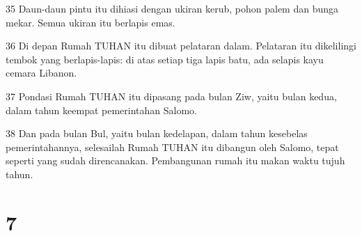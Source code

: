 \par 35 Daun-daun pintu itu dihiasi dengan ukiran kerub, pohon palem dan bunga mekar. Semua ukiran itu berlapis emas.
\par 36 Di depan Rumah TUHAN itu dibuat pelataran dalam. Pelataran itu dikelilingi tembok yang berlapis-lapis: di atas setiap tiga lapis batu, ada selapis kayu cemara Libanon.
\par 37 Pondasi Rumah TUHAN itu dipasang pada bulan Ziw, yaitu bulan kedua, dalam tahun keempat pemerintahan Salomo.
\par 38 Dan pada bulan Bul, yaitu bulan kedelapan, dalam tahun kesebelas pemerintahannya, selesailah Rumah TUHAN itu dibangun oleh Salomo, tepat seperti yang sudah direncanakan. Pembangunan rumah itu makan waktu tujuh tahun.

\chapter{7}

